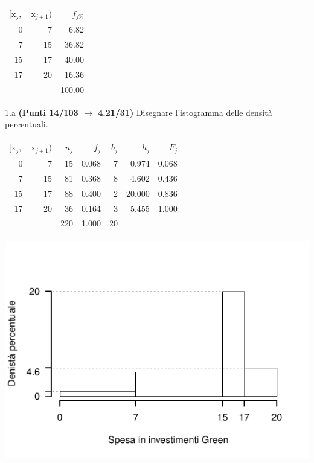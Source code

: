 \documentclass[
  11pt,
]{book}
\theoremstyle{mytheoremstyle}
\theoremstyle{mydefstyle}
\newenvironment{sol}
  {
  \begin{tcolorbox}[enhanced,breakable,arc=0.1mm,boxrule=1pt,colback=white,colframe=iblue,
  title=\bf \fontfamily{lmss}\selectfont \hspace{.5 cm} Soluzione,drop fuzzy shadow]

}{
\end{tcolorbox}
  }
\begin{document}
\begin{table}[H]
\centering
\begin{tabular}{rrr}
\toprule
$[\text{x}_j,$ & $\text{x}_{j+1})$ & $f_{j\%}$\\
\midrule
0 & 7 & 6.82\\
7 & 15 & 36.82\\
15 & 17 & 40.00\\
17 & 20 & 16.36\\
 &  & 100.00\\
\bottomrule
\end{tabular}
\end{table}

1.a \textbf{(Punti 14/103 \(\rightarrow\) 4.21/31)} Disegnare l'istogramma delle densità percentuali.

\begin{sol}

\begin{table}[H]
\centering
\begin{tabular}{rrrrrrr}
\toprule
$[\text{x}_j,$ & $\text{x}_{j+1})$ & $n_j$ & $f_j$ & $b_j$ & $h_j$ & $F_j$\\
\midrule
0 & 7 & 15 & 0.068 & 7 & 0.974 & 0.068\\
7 & 15 & 81 & 0.368 & 8 & 4.602 & 0.436\\
15 & 17 & 88 & 0.400 & 2 & 20.000 & 0.836\\
17 & 20 & 36 & 0.164 & 3 & 5.455 & 1.000\\
 &  & 220 & 1.000 & 20 &  & \\
\bottomrule
\end{tabular}
\end{table}

\begin{center}\includegraphics{Esami_passati_con_soluzioni_files/figure-latex/2022-56-1} \end{center}

\end{sol}
\end{document}
